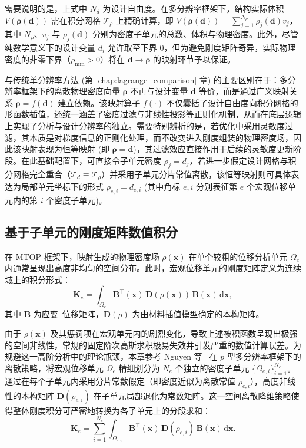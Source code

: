 需要说明的是，上式中 $N_d$ 为设计自由度。在多分辨率框架下，结构实际体积 $V(\boldsymbol{\rho}(\boldsymbol{d}))$ 需在积分网格 $\mathcal{T}_\rho$ 上精确计算，即 $V(\boldsymbol{\rho}(\boldsymbol{d})) = \sum_{j=1}^{N_\rho} \rho_j(\boldsymbol{d}) v_j$，其中 $N_\rho$、$v_j$ 与 $\rho_j(\boldsymbol{d})$ 分别为密度子单元的总数、体积与物理密度。此外，尽管纯数学意义下的设计变量 $d_i$ 允许取至下界 $0$，但为避免刚度矩阵奇异，实际物理密度的非零下界（$\rho_{\min} > 0$）将在 $\boldsymbol{d} \to \boldsymbol{\rho}$ 的映射环节予以保证。

与传统单分辨率方法 (第 \ref{chap:lagrange_comparison} 章) 的主要区别在于：多分辨率框架下的离散物理密度向量 $\boldsymbol{\rho}$ 不再与设计变量 $\boldsymbol{d}$ 等价，而是通过广义映射关系 $\boldsymbol{\rho}=f(\boldsymbol{d})$ 建立依赖。该映射算子 $f(\cdot)$ 不仅囊括了设计自由度向积分网格的形函数插值，还统一涵盖了密度过滤与非线性投影等正则化机制，从而在底层逻辑上实现了分析与设计分辨率的独立。需要特别辨析的是，若优化中采用灵敏度过滤，其本质是对梯度信息的正则化处理，而不改变进入刚度组装的物理密度场，因此该映射表现为恒等映射 (即 $\boldsymbol{\rho} = \boldsymbol{d}$)，其过滤效应直接作用于后续的灵敏度更新阶段。在此基础配置下，可直接令子单元密度 $\rho_j = d_j$，若进一步假定设计网格与积分网格完全重合（$\mathcal{T}_d \equiv \mathcal{T}_\rho$）并采用子单元分片常值离散，该恒等映射则可具体表达为局部单元坐标下的形式 $\rho_{e,i} = d_{e,i}$ (其中角标 $e,i$ 分别表征第 $e$ 个宏观位移单元内的第 $i$ 个密度子单元)。


\subsection{基于子单元的刚度矩阵数值积分}
\label{subsec:subcell_stiffness_integration}

在 MTOP 框架下，映射生成的物理密度场 $\rho(\boldsymbol{x})$ 在单个较粗的位移分析单元 $\Omega_e$ 内通常呈现出高度非均匀的空间分布。此时，宏观位移单元的刚度矩阵定义为连续域上的积分形式：
\[
\boldsymbol{K}_e=\int_{\Omega_e}\boldsymbol{B}^{\top}(\boldsymbol{x})\,\boldsymbol{D}(\rho(\boldsymbol{x}))\,\boldsymbol{B}(\boldsymbol{x})\,\mathrm{d}\boldsymbol{x},
\]
其中 $\boldsymbol{B}$ 为应变–位移矩阵，$\boldsymbol{D}(\rho)$ 为由材料插值模型确定的本构矩阵。

由于 $\rho(\boldsymbol{x})$ 及其惩罚项在宏观单元内的剧烈变化，导致上述被积函数呈现出极强的空间非线性，常规的固定阶次高斯求积极易失效并引发严重的数值计算误差。为规避这一高阶分析中的理论瓶颈，本章参考 Nguyen 等~\cite{nguyenTopologyOptimizationUsing2017a} 在 $p$ 型多分辨率框架下的离散策略，将宏观位移单元 $\Omega_e$ 精细划分为 $N_e$ 个独立的密度子单元 $\{\Omega_{e,i}\}_{i=1}^{N_e}$。通过在每个子单元内采用分片常数假定（即密度近似为离散常值 $\rho_{e,i}$），高度非线性的本构矩阵 $\boldsymbol{D}(\rho_{e,i})$ 在子单元局部退化为常数矩阵。这一空间离散降维策略使得整体刚度积分可严密地转换为各子单元上的分段求和：
\[
\boldsymbol{K}_e =\sum_{i=1}^{N_e}\int_{\Omega_{e,i}}\boldsymbol{B}^{\top}(\boldsymbol{x})\,\boldsymbol{D}(\rho_{e,i})\,\boldsymbol{B}(\boldsymbol{x})\,\mathrm d\boldsymbol{x}.
\]

